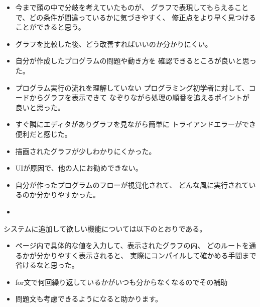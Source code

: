 \documentclass{cssspaper}
\begin{document}
        \begin{itemize}
            \item 今まで頭の中で分岐を考えていたものが、
            グラフで表現してもらえることで、どの条件が間違っているかに気づきやすく、
            修正点をより早く見つけることができると思う。

            \item グラフを比較した後、どう改善すればいいのか分かりにくい。
            
            \item 自分が作成したプログラムの問題や動き方を
            確認できるところが良いと思った。

            \item プログラム実行の流れを理解していない
            プログラミング初学者に対して、コードからグラフを表示できて
            なぞりながら処理の順番を追えるポイントが良いと思った。

            \item すぐ隣にエディタがありグラフを見ながら簡単に
            トライアンドエラーができ便利だと感じた。

            \item 描画されたグラフが少しわかりにくかった。
            
            \item UIが原因で、他の人にお勧めできない。
            
            \item 自分が作ったプログラムのフローが視覚化されて、
            どんな風に実行されているのか分かりやすかった。
            
            \item 
        \end{itemize}

        システムに追加して欲しい機能については以下のとおりである。

        \begin{itemize}
            \item ページ内で具体的な値を入力して、表示されたグラフの内、
            どのルートを通るかが分かりやすく表示されると、
            実際にコンパイルして確かめる手間まで省けるなと思った。
            \item for文で何回繰り返しているかがいつも分からなくなるのでその補助
            
            \item 問題文も考慮できるようになると助かります。
        \end{itemize}
\end{document}
